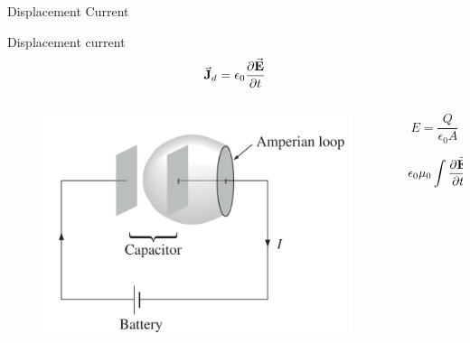 \documentclass{beamer}
\begin{document}
\begin{frame}{Displacement Current}
    \begin{block}{Displacement current}
        \begin{equation}
            \va{J}_d = \epsilon_0 \pdv{\va{E}}{t}
        \end{equation}
    \end{block}

    \begin{columns}
        \begin{column}{0.5\textwidth}
            \begin{figure}[htbp]
                \centering
                \includegraphics[width=\textwidth]{Images/amp.jpg}
            \end{figure}
        \end{column}
        \begin{column}{0.5\textwidth}
            \begin{equation}
                E = \frac{Q}{\epsilon_0 A}
            \end{equation}

            \begin{equation}
                \epsilon_0 \mu_0 \int \pdv{\va{E}}{t} \vdot \dd{\va{a}} = \mu_0 I
            \end{equation}
        \end{column}
    \end{columns}
\end{frame}
\end{document}
